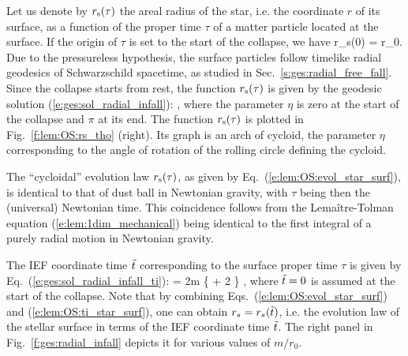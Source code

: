 Let us denote by $r_{\rm s}(\tau)$ the areal radius of the star, i.e. the coordinate $r$
of its surface, as a function of the proper time $\tau$ of a matter particle
located at the surface. If the origin of $\tau$ is set to
the start of the collapse, we have
\be
    r_{\rm s}(0) = r_0.
\ee
Due to the pressureless hypothesis, the surface particles follow timelike radial geodesics
of Schwarzschild spacetime, as studied in Sec.~\ref{s:ges:radial_free_fall}.
Since the collapse starts from rest, the function $r_{\rm s}(\tau)$ is
given by the geodesic solution (\ref{e:ges:sol_radial_infall}):
\be \label{e:lem:OS:evol_star_surf}
     \leq \eta \leq \pi ,
\ee
where the parameter $\eta$ is zero at the start of the collapse and $\pi$ at its end.
The function $r_{\rm s}(\tau)$ is plotted in Fig.~\ref{f:lem:OS:rs_tho} (right).
Its graph is an arch of cycloid, the parameter $\eta$ corresponding
to the angle of rotation of the rolling circle defining the cycloid.
\begin{remark} \label{r:lem:OS:cycloid}
The ``cycloidal'' evolution law $r_{\rm s}(\tau)$, as given by Eq.~(\ref{e:lem:OS:evol_star_surf}),
is identical to that of dust ball in Newtonian gravity, with $\tau$ being then the (universal) Newtonian
time. This coincidence follows from the Lemaître-Tolman equation (\ref{e:lem:1dim_mechanical})
being identical to the first integral of a purely radial motion in Newtonian gravity.
\end{remark}

The IEF coordinate time ${\tilde t}$ corresponding to the surface proper time $\tau$
is given by Eq.~(\ref{e:ges:sol_radial_infall_ti}):
\be \label{e:lem:OS:ti_star_surf}
     \ti = 2m \left\{  
    +  2 \ln {} \right\}  ,
\ee
where ${\tilde t} = 0$ is assumed at the start of the collapse.
Note that by combining Eqs.~(\ref{e:lem:OS:evol_star_surf}) and (\ref{e:lem:OS:ti_star_surf}),
one can obtain $r_s = r_s({\tilde t})$, i.e. the evolution law of the stellar surface
in terms of the IEF coordinate time ${\tilde t}$.
The right panel in Fig.~\ref{f:ges:radial_infall}
depicts it for various values of $m/r_0$.


